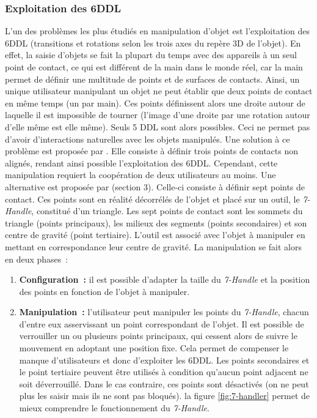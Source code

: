 \documentclass[11pt]{article}
\begin{document}
\subsubsection{Exploitation des 6DDL}
L'un des problèmes les plus étudiés en manipulation d'objet est l'exploitation des 6DDL (transitions et rotations selon les trois axes du repère 3D de l'objet). En effet, la saisie d'objets se fait la plupart du temps avec des appareils à un seul point de contact, ce qui est différent de la main dans le monde réel, car la main permet de définir une multitude de points et de surfaces de contacts. Ainsi, un unique utilisateur manipulant un objet ne peut établir que deux points de contact en même temps (un par main). Ces points définissent alors une droite autour de laquelle il est impossible de tourner (l'image d'une droite par une rotation autour d'elle même est elle même). Seuls 5 DDL sont alors possibles. Ceci ne permet pas d'avoir d'interactions naturelles avec les objets manipulés. Une solution à ce problème est proposée par \cite{3-hand}. Elle consiste à définir trois points de contacts non alignés, rendant ainsi possible l'exploitation des 6DDL. Cependant, cette manipulation requiert la coopération de deux utilisateurs au moins. Une alternative est proposée par \cite{thesis} (section 3). Celle-ci consiste à définir sept points de contact. Ces points sont en réalité décorrélés de l'objet et placé sur un outil, le \textit{7-Handle}, constitué d'un triangle. Les sept points de contact sont les sommets du triangle (points principaux), les milieux des segments (points secondaires) et son centre de gravité (point tertiaire). L'outil est associé avec l'objet à manipuler en mettant en correspondance leur centre de gravité. La manipulation se fait alors en deux phases~:
\begin{enumerate}
	\item \textbf{Configuration~:} il est possible d'adapter la taille du \textit{7-Handle} et la position des points en fonction de l'objet à manipuler.
	\item \textbf{Manipulation~:} l'utilisateur peut manipuler les points du \textit{7-Handle}, chacun d'entre eux asservissant un point correspondant de l'objet. Il est possible de verrouiller un ou plusieurs points principaux, qui cessent alors de suivre le mouvement en adoptant une position fixe. Cela permet de compenser le manque d'utilisateurs et donc d'exploiter les 6DDL. Les points secondaires et le point tertiaire peuvent être utilisés à condition qu'aucun point adjacent ne soit déverrouillé. Dans le cas contraire, ces points sont désactivés (on ne peut plus les saisir mais ils ne sont pas bloqués). la figure \ref{fig:7-handler} permet de mieux comprendre le fonctionnement du \textit{7-Handle}.
\end{enumerate}
\end{document}
